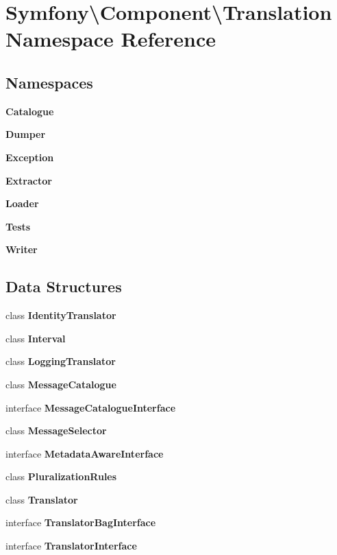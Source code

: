\section{Symfony\textbackslash{}Component\textbackslash{}Translation Namespace Reference}
\label{namespace_symfony_1_1_component_1_1_translation}
\subsection*{Namespaces}
\begin{DoxyCompactItemize}
\item 
 {\bf Catalogue}
\item 
 {\bf Dumper}
\item 
 {\bf Exception}
\item 
 {\bf Extractor}
\item 
 {\bf Loader}
\item 
 {\bf Tests}
\item 
 {\bf Writer}
\end{DoxyCompactItemize}
\subsection*{Data Structures}
\begin{DoxyCompactItemize}
\item 
class {\bf Identity\+Translator}
\item 
class {\bf Interval}
\item 
class {\bf Logging\+Translator}
\item 
class {\bf Message\+Catalogue}
\item 
interface {\bf Message\+Catalogue\+Interface}
\item 
class {\bf Message\+Selector}
\item 
interface {\bf Metadata\+Aware\+Interface}
\item 
class {\bf Pluralization\+Rules}
\item 
class {\bf Translator}
\item 
interface {\bf Translator\+Bag\+Interface}
\item 
interface {\bf Translator\+Interface}
\end{DoxyCompactItemize}
